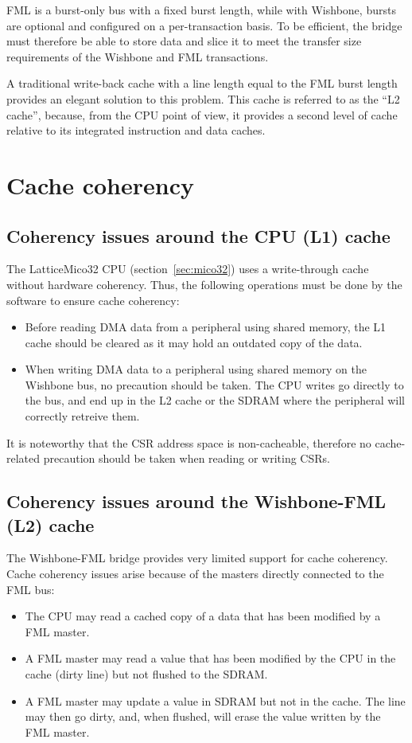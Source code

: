 \documentclass[a4paper,11pt]{kthesis}
\begin{document}
FML is a burst-only bus with a fixed burst length, while with Wishbone, bursts are optional and configured on a per-transaction basis. To be efficient, the bridge must therefore be able to store data and slice it to meet the transfer size requirements of the Wishbone and FML transactions.

A traditional write-back cache with a line length equal to the FML burst length provides an elegant solution to this problem. This cache is referred to as the ``L2 cache'', because, from the CPU point of view, it provides a second level of cache relative to its integrated instruction and data caches.

\section{Cache coherency}
\label{sec:coherency}
\subsection{Coherency issues around the CPU (L1) cache}
The LatticeMico32 CPU (section~\ref{sec:mico32}) uses a write-through cache without hardware coherency. Thus, the following operations must be done by the software to ensure cache coherency:
\begin{itemize}
\item Before reading DMA data from a peripheral using shared memory, the L1 cache should be cleared as it may hold an outdated copy of the data.
\item When writing DMA data to a peripheral using shared memory on the Wishbone bus, no precaution should be taken. The CPU writes go directly to the bus, and end up in the L2 cache or the SDRAM where the peripheral will correctly retreive them.
\end{itemize}

It is noteworthy that the CSR address space is non-cacheable, therefore no cache-related precaution should be taken when reading or writing CSRs.

\subsection{Coherency issues around the Wishbone-FML (L2) cache}
The Wishbone-FML bridge provides very limited support for cache coherency. Cache coherency issues arise because of the masters directly connected to the FML bus:
\begin{itemize}
\item The CPU may read a cached copy of a data that has been modified by a FML master.
\item A FML master may read a value that has been modified by the CPU in the cache (dirty line) but not flushed to the SDRAM.
\item A FML master may update a value in SDRAM but not in the cache. The line may then go dirty, and, when flushed, will erase the value written by the FML master.
\end{itemize}
\end{document}
